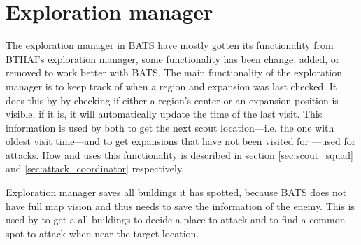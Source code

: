 \section{Exploration manager}
\label{sec:exploration_manager}
The exploration manager in BATS have mostly gotten its functionality from BTHAI’s exploration manager, some functionality has been change, added, or removed to work better with BATS. The main functionality of the exploration manager is to keep track of when a region and expansion was last checked. It does this by by checking if either a region’s center or an expansion position is visible, if it is, it will automatically update the time of the last visit. This information is used by both  to get the next scout location—i.e. the one with oldest visit time—and  to get expansions that have not been visited for \attackCoordinatorExpansionNotCheckedTime—used for attacks. How  and  uses this functionality is described in section \ref{sec:scout_squad} and \ref{sec:attack_coordinator} respectively.

Exploration manager saves all buildings it has spotted, because BATS does not have full map vision and thus needs to save the information of the enemy. This is used by  to get a all buildings to decide a place to attack and  to find a common spot to attack when near the target location.